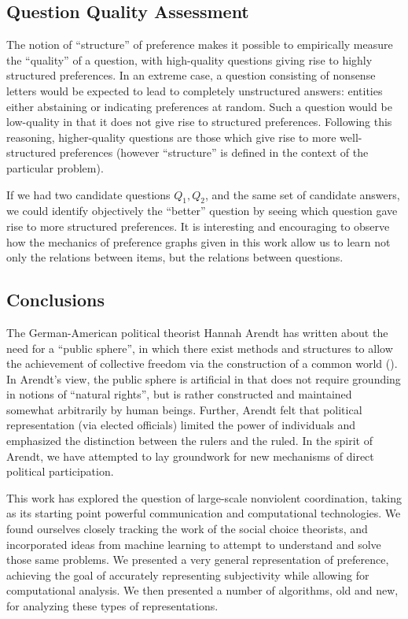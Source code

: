 \subsection{Question Quality Assessment}

The notion of ``structure'' of preference makes it possible to empirically measure the ``quality'' of a question, with high-quality questions giving rise to highly structured preferences.
In an extreme case, a question consisting of nonsense letters would be expected to lead to completely unstructured answers: entities either abstaining or indicating preferences at random.
Such a question would be low-quality in that it does not give rise to structured preferences.
Following this reasoning, higher-quality questions are those which give rise to more well-structured preferences (however ``structure'' is defined in the context of the particular problem).

If we had two candidate questions $Q_1, Q_2$, and the same set of candidate answers, we could identify objectively the ``better'' question by seeing which question gave rise to more structured preferences.
It is interesting and encouraging to observe how the mechanics of preference graphs given in this work allow us to learn not only the relations between items, but the relations between questions.

\subsection{Conclusions}

The German-American political theorist Hannah Arendt has written about the need for a ``public sphere'', in which there exist methods and structures to allow the achievement of collective freedom via the construction of a common world (\cite{dentreves:2016}).
In Arendt's view, the public sphere is artificial in that does not require grounding in notions of ``natural rights'', but is rather constructed and maintained somewhat arbitrarily by human beings.
Further, Arendt felt that political representation (via elected officials) limited the power of individuals and emphasized the distinction between the rulers and the ruled.
In the spirit of Arendt, we have attempted to lay groundwork for new mechanisms of direct political participation.

\bigskip

This work has explored the question of large-scale nonviolent coordination, taking as its starting point powerful communication and computational technologies.
We found ourselves closely tracking the work of the social choice theorists, and incorporated ideas from machine learning to attempt to understand and solve those same problems.
We presented a very general representation of preference, achieving the goal of accurately representing subjectivity while allowing for computational analysis.
We then presented a number of algorithms, old and new, for analyzing these types of representations.

